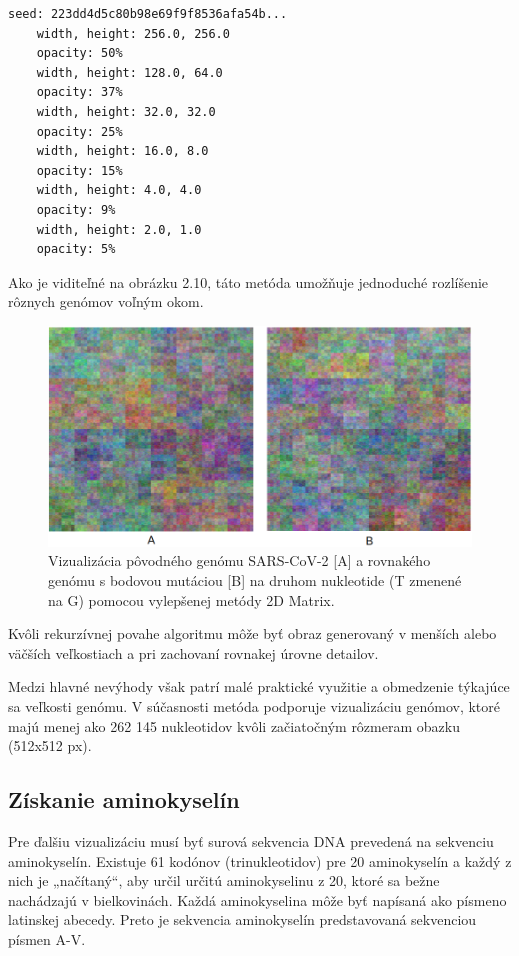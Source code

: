 \begin{lstlisting}[caption=Výstup z konzoly vyrobený počas vizualizácie pomocou vylepšenej metódy 2D Matrix.]
    seed: 223dd4d5c80b98e69f9f8536afa54b...
    width, height: 256.0, 256.0
    opacity: 50%
    width, height: 128.0, 64.0
    opacity: 37%
    width, height: 32.0, 32.0
    opacity: 25%
    width, height: 16.0, 8.0
    opacity: 15%
    width, height: 4.0, 4.0
    opacity: 9%
    width, height: 2.0, 1.0
    opacity: 5%
\end{lstlisting}

Ako je viditeľné na obrázku 2.10, táto metóda umožňuje jednoduché rozlíšenie rôznych genómov voľným okom.

\begin{figure}[!ht]
	\centering
	\includegraphics[width=1\textwidth]{figures/2dim.png}
	\caption{Vizualizácia pôvodného genómu SARS-CoV-2 [A] a rovnakého genómu s bodovou mutáciou [B] na druhom nukleotide (T zmenené na G) pomocou vylepšenej metódy 2D Matrix.\label{o:latex_friendly_zone}}
\end{figure}

Kvôli rekurzívnej povahe algoritmu môže byť obraz generovaný v menších alebo väčších veľkostiach a pri zachovaní rovnakej úrovne detailov.

Medzi hlavné nevýhody však patrí malé praktické využitie a obmedzenie týkajúce sa veľkosti genómu.
V súčasnosti metóda podporuje vizualizáciu genómov, ktoré majú menej ako 262 145 nukleotidov kvôli začiatočným rôzmeram obazku (512x512 px).

\subsection{Získanie aminokyselín}

Pre ďalšiu vizualizáciu musí byť surová sekvencia DNA prevedená na sekvenciu aminokyselín.
Existuje 61 kodónov (trinukleotidov) pre 20 aminokyselín a každý z nich je „načítaný“, aby určil určitú aminokyselinu z 20, ktoré sa bežne nachádzajú v bielkovinách.
Každá aminokyselina môže byť napísaná ako písmeno latinskej abecedy.
Preto je sekvencia aminokyselín predstavovaná sekvenciou písmen A-V.

